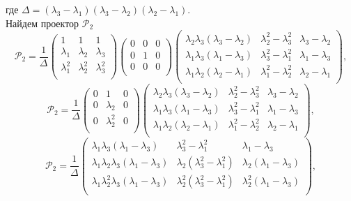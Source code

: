 где $\Delta = (\lambda_3-\lambda_1)(\lambda_3-\lambda_2)(\lambda_2-\lambda_1).$ \\
Найдем проектор $\mathcal{P}_2$
$$
\mathcal{P}_2 = 
\frac{1}{\Delta}
\begin{pmatrix}
  	1 & 1 & 1\\
  	\lambda_1 & \lambda_2 & \lambda_3 \\
  	\lambda_1^2 & \lambda_2^2 & \lambda_3^2 \\
 \end{pmatrix}
\begin{pmatrix}
  	0 & 0 & 0\\
  	0 & 1 & 0\\
  	0 & 0 & 0 \\
 \end{pmatrix}
\begin{pmatrix}
  	\lambda_2\lambda_3(\lambda_3-\lambda_2) & \lambda_2^2-\lambda_3^2 & \lambda_3-\lambda_2\\
  	\lambda_1\lambda_3(\lambda_1-\lambda_3) & \lambda_3^2-\lambda_1^2 & \lambda_1-\lambda_3\\
  	\lambda_1\lambda_2(\lambda_2-\lambda_1) & \lambda_1^2-\lambda_2^2 & \lambda_2-\lambda_1\\
 \end{pmatrix},
$$
$$
\mathcal{P}_2 = 
\frac{1}{\Delta}
\begin{pmatrix}
  	0 & 1 & 0\\
  	0 & \lambda_2 & 0 \\
  	0 & \lambda_2^2 & 0 \\
 \end{pmatrix}
\begin{pmatrix}
  	\lambda_2\lambda_3(\lambda_3-\lambda_2) & \lambda_2^2-\lambda_3^2 & \lambda_3-\lambda_2\\
  	\lambda_1\lambda_3(\lambda_1-\lambda_3) & \lambda_3^2-\lambda_1^2 & \lambda_1-\lambda_3\\
  	\lambda_1\lambda_2(\lambda_2-\lambda_1) & \lambda_1^2-\lambda_2^2 & \lambda_2-\lambda_1\\
 \end{pmatrix},
$$
$$
\mathcal{P}_2 = 
\frac{1}{\Delta}
\begin{pmatrix}
  	\lambda_1\lambda_3(\lambda_1-\lambda_3) & \lambda_3^2-\lambda_1^2 & \lambda_1-\lambda_3\\
  	\lambda_1\lambda_2\lambda_3(\lambda_1-\lambda_3) & \lambda_2(\lambda_3^2-\lambda_1^2) & \lambda_2(\lambda_1-\lambda_3)\\
  	\lambda_1\lambda_2^2\lambda_3(\lambda_1-\lambda_3) & \lambda_2^2(\lambda_3^2-\lambda_1^2) & \lambda_2^2(\lambda_1-\lambda_3)\\
 \end{pmatrix},
$$
